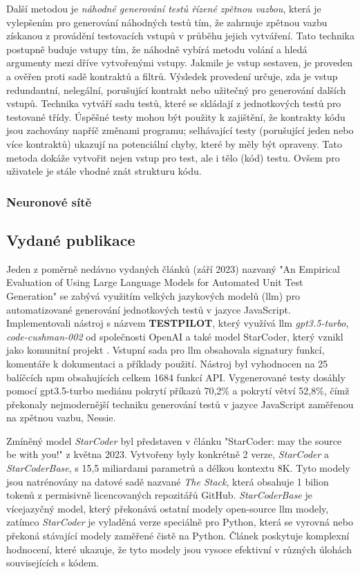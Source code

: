 \documentclass[12pt]{article}
\begin{document}
            Další metodou je \textit{náhodné generování testů řízené zpětnou vazbou}, která je vylepšením pro generování náhodných testů tím, že zahrnuje zpětnou vazbu získanou z provádění testovacích vstupů v průběhu jejich vytváření. Tato technika postupně buduje vstupy tím, že náhodně vybírá metodu volání a hledá argumenty mezi dříve vytvořenými vstupy. Jakmile je vstup sestaven, je proveden a ověřen proti sadě kontraktů a filtrů. Výsledek provedení určuje, zda je vstup redundantní, nelegální, porušující kontrakt nebo užitečný pro generování dalších vstupů. Technika vytváří sadu testů, které se skládají z jednotkových testů pro testované třídy. Úspěšné testy mohou být použity k zajištění, že kontrakty kódu jsou zachovány napříč změnami programu; selhávající testy (porušující jeden nebo více kontraktů) ukazují na potenciální chyby, které by měly být opraveny. Tato metoda dokáže vytvořit nejen vstup pro test, ale i tělo (kód) testu. Ovšem pro uživatele je stále vhodné znát strukturu kódu. \cite{FeedbackDirectedRT}

            \subsubsection{Neuronové sítě}

    
        \subsection{Vydané publikace}
        Jeden z poměrně nedávno vydaných článků (září 2023) nazvaný "An Empirical Evaluation of Using Large Language Models for Automated Unit Test Generation" \cite{schafer2023empirical} se zabývá využitím velkých jazykových modelů (\gls{llm}) pro automatizované generování jednotkových testů v jazyce JavaScript. Implementovali nástroj s názvem \textbf{TESTPILOT}, který využívá \gls{llm} \textit{gpt3.5-turbo}, \textit{code-cushman-002} od společnosti OpenAI a  také model StarCoder, který vznikl jako komunitní projekt \cite{StarCoder2023}. Vstupní sada pro \gls{llm} obsahovala signatury funkcí, komentáře k dokumentaci a příklady použití. Nástroj byl vyhodnocen na 25 balíčcích npm obsahujících celkem 1684 funkcí API. Vygenerované testy dosáhly pomocí gpt3.5-turbo mediánu pokrytí příkazů 70,2\% a pokrytí větví 52,8\%, čímž překonaly nejmodernější techniku generování testů v jazyce JavaScript zaměřenou na zpětnou vazbu, Nessie.

        Zmíněný model \emph{StarCoder} byl představen v článku "StarCoder: may the source be with you!" \cite{StarCoder2023} z května 2023. Vytvořeny byly konkrétně 2 verze, \textit{StarCoder} a \textit{StarCoderBase}, s 15,5 miliardami parametrů a délkou kontextu 8K. Tyto modely jsou natrénovány na datové sadě nazvané \textit{The Stack}, která obsahuje 1 bilion tokenů z permisivně licencovaných repozitářů GitHub. \textit{StarCoderBase} je vícejazyčný model, který překonává ostatní modely open-source \gls{llm} modely, zatímco \textit{StarCoder} je vyladěná verze speciálně pro Python, která se vyrovná nebo překoná stávající modely zaměřené čistě na Python. Článek poskytuje komplexní hodnocení, které ukazuje, že tyto modely jsou vysoce efektivní v různých úlohách souvisejících s kódem.
\end{document}
